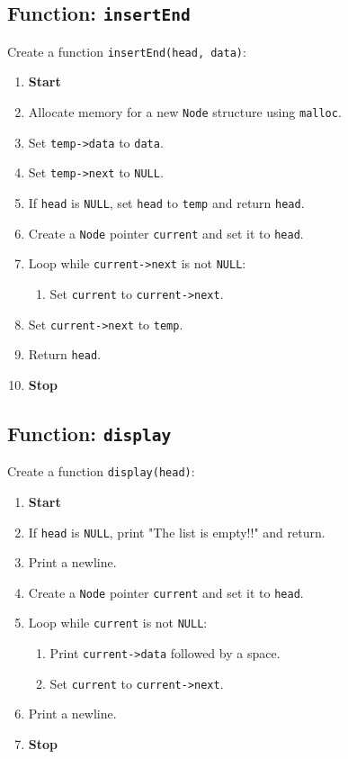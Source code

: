 {  \subsection{Function: \texttt{insertEnd}}
  Create a function \texttt{insertEnd(head, data)}:
  \begin{enumerate}[label=\arabic*:,left=0pt]
    \item \textbf{Start}
    \item Allocate memory for a new \texttt{Node} structure using \texttt{malloc}.
    \item Set \texttt{temp->data} to \texttt{data}.
    \item Set \texttt{temp->next} to \texttt{NULL}.
    \item If \texttt{head} is \texttt{NULL}, set \texttt{head} to \texttt{temp} and return \texttt{head}.
    \item Create a \texttt{Node} pointer \texttt{current} and set it to \texttt{head}.
    \item Loop while \texttt{current->next} is not \texttt{NULL}:
          \begin{enumerate}[label=2.\arabic*:, start=1]
            \item Set \texttt{current} to \texttt{current->next}.
          \end{enumerate}
    \item Set \texttt{current->next} to \texttt{temp}.
    \item Return \texttt{head}.
    \item \textbf{Stop}
  \end{enumerate}

  \subsection{Function: \texttt{display}}
  Create a function \texttt{display(head)}:
  \begin{enumerate}[label=\arabic*:,left=0pt]
    \item \textbf{Start}
    \item If \texttt{head} is \texttt{NULL}, print "The list is empty!!" and return.
    \item Print a newline.
    \item Create a \texttt{Node} pointer \texttt{current} and set it to \texttt{head}.
    \item Loop while \texttt{current} is not \texttt{NULL}:
          \begin{enumerate}[label=2.\arabic*:, start=1]
            \item Print \texttt{current->data} followed by a space.
            \item Set \texttt{current} to \texttt{current->next}.
          \end{enumerate}
    \item Print a newline.
    \item \textbf{Stop}
  \end{enumerate}

}
